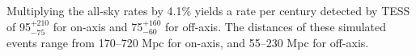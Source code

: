 \documentclass[modern]{aastex61}
\newcommand{\red}[1]{\textcolor{red}{#1}}
\begin{document}
Multiplying the all-sky rates by 4.1\% yields a rate per century detected by TESS of 95$^{+210}_{-75}$ for on-axis and 75$^{+160}_{-60}$ for off-axis. The distances of these simulated events range from  170--720 Mpc for on-axis, and 55--230 Mpc for off-axis.



\end{document}
